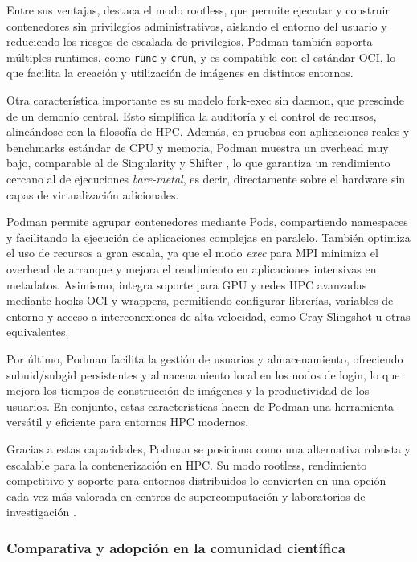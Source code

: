 Entre sus ventajas, destaca el modo rootless, que permite ejecutar y construir contenedores sin privilegios administrativos, aislando el entorno del usuario y reduciendo los riesgos de escalada de privilegios. Podman también soporta múltiples runtimes, como \texttt{runc} y \texttt{crun}, y es compatible con el estándar OCI, lo que facilita la creación y utilización de imágenes en distintos entornos.

Otra característica importante es su modelo fork-exec sin daemon, que prescinde de un demonio central. Esto simplifica la auditoría y el control de recursos, alineándose con la filosofía de HPC. Además, en pruebas con aplicaciones reales y benchmarks estándar de CPU y memoria, Podman muestra un overhead muy bajo, comparable al de Singularity y Shifter \cite{gantikow2020rootless, stephey2022scaling}, lo que garantiza un rendimiento cercano al de ejecuciones \textit{bare-metal}, es decir, directamente sobre el hardware sin capas de virtualización adicionales.

Podman permite agrupar contenedores mediante Pods, compartiendo namespaces y facilitando la ejecución de aplicaciones complejas en paralelo. También optimiza el uso de recursos a gran escala, ya que el modo \textit{exec} para MPI minimiza el overhead de arranque y mejora el rendimiento en aplicaciones intensivas en metadatos. Asimismo, integra soporte para GPU y redes HPC avanzadas mediante hooks OCI y wrappers, permitiendo configurar librerías, variables de entorno y acceso a interconexiones de alta velocidad, como Cray Slingshot u otras equivalentes.

Por último, Podman facilita la gestión de usuarios y almacenamiento, ofreciendo subuid/subgid persistentes y almacenamiento local en los nodos de login, lo que mejora los tiempos de construcción de imágenes y la productividad de los usuarios. En conjunto, estas características hacen de Podman una herramienta versátil y eficiente para entornos HPC modernos.

Gracias a estas capacidades, Podman se posiciona como una alternativa robusta y escalable para la contenerización en HPC. Su modo rootless, rendimiento competitivo y soporte para entornos distribuidos lo convierten en una opción cada vez más valorada en centros de supercomputación y laboratorios de investigación \cite{gantikow2020rootless, stephey2022scaling}.

\subsubsection{Comparativa y adopción en la comunidad científica}

